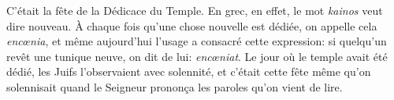 C’était la fête de la Dédicace du Temple.
En grec, en effet, le mot \textit{kainos} veut dire nouveau.
À chaque fois qu’une chose nouvelle est dédiée,
	on appelle cela \textit{encœnia},
	et même aujourd’hui l’usage a consacré cette expression:
	si quelqu’un revêt une tunique neuve, on dit de lui: \textit{encœniat}.
Le jour où le temple avait été dédié, les Juifs l’observaient avec solennité,
	et c’était cette fête même qu’on solennisait
		quand le Seigneur prononça les paroles qu’on vient de lire.
